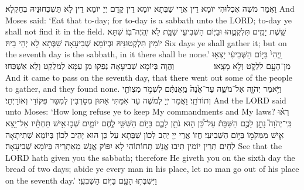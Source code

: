 {{וַאֲמַר מֹשֶׁה אִכְלוּהִי יוֹמָא דֵין אֲרֵי שַׁבְּתָא יוֹמָא דֵין קֳדָם יְיָ יוֹמָא דֵין לָא תַּשְׁכְּחוּנֵּיהּ בְּחַקְלָא׃}
{And Moses said: ‘Eat that to-day; for to-day is a sabbath unto the LORD; to-day ye shall not find it in the field.}{}
{שֵׁ֥שֶׁת יָמִ֖ים תִּלְקְטֻ֑הוּ וּבַיּ֧וֹם הַשְּׁבִיעִ֛י שַׁבָּ֖ת לֹ֥א יִֽהְיֶה־בּֽוֹ׃
}
{שִׁתָּא יוֹמִין תִּלְקְטוּנֵּיהּ וּבְיוֹמָא שְׁבִיעָאָה שַׁבְּתָא לָא יְהֵי בֵיהּ׃}
{Six days ye shall gather it; but on the seventh day is the sabbath, in it there shall be none.’}{}
{וַֽיְהִי֙ בַּיּ֣וֹם הַשְּׁבִיעִ֔י יָצְא֥וּ מִן־הָעָ֖ם לִלְקֹ֑ט וְלֹ֖א מָצָֽאוּ׃ \setuma         }
{וַהֲוָה בְּיוֹמָא שְׁבִיעָאָה נְפַקוּ מִן עַמָּא לְמִלְקַט וְלָא אַשְׁכַּחוּ׃}
{And it came to pass on the seventh day, that there went out some of the people to gather, and they found none.}{}
{וַיֹּ֥אמֶר יְהֹוָ֖ה אֶל־מֹשֶׁ֑ה עַד־אָ֙נָה֙ מֵֽאַנְתֶּ֔ם לִשְׁמֹ֥ר מִצְוֺתַ֖י וְתוֹרֹתָֽי׃
}
{וַאֲמַר יְיָ לְמֹשֶׁה עַד אִמַּתִּי אַתּוּן מְסָרְבִין לְמִטַּר פִּקּוֹדַי וְאוֹרָיְתָי׃}
{And the LORD said unto Moses: ‘How long refuse ye to keep My commandments and My laws?}{}
{רְא֗וּ כִּֽי־יְהֹוָה֮ נָתַ֣ן לָכֶ֣ם הַשַּׁבָּת֒ עַל־כֵּ֠ן ה֣וּא נֹתֵ֥ן לָכֶ֛ם בַּיּ֥וֹם הַשִּׁשִּׁ֖י לֶ֣חֶם יוֹמָ֑יִם שְׁב֣וּ \legarmeh  אִ֣ישׁ תַּחְתָּ֗יו אַל־יֵ֥צֵא אִ֛ישׁ מִמְּקֹמ֖וֹ בַּיּ֥וֹם הַשְּׁבִיעִֽי׃
}
{חֲזוֹ אֲרֵי יְיָ יְהַב לְכוֹן שַׁבְּתָא עַל כֵּן הוּא יָהֵיב לְכוֹן בְּיוֹמָא שְׁתִיתָאָה לְחֵים תְּרֵין יוֹמִין תִּיבוּ אֱנָשׁ תְּחוֹתוֹהִי לָא יִפּוֹק אֱנָשׁ מֵאַתְרֵיהּ בְּיוֹמָא שְׁבִיעָאָה׃}
{See that the LORD hath given you the sabbath; therefore He giveth you on the sixth day the bread of two days; abide ye every man in his place, let no man go out of his place on the seventh day.’}{}
{וַיִּשְׁבְּת֥וּ הָעָ֖ם בַּיּ֥וֹם הַשְּׁבִעִֽי׃}
}
